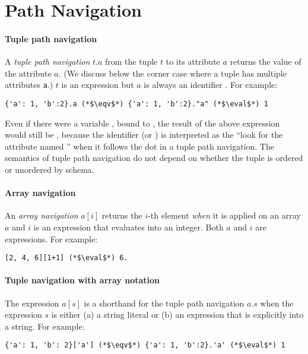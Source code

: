 \section{Path Navigation}
\label{section:paths}

\paragraph{Tuple path navigation} A \textit{tuple path navigation}
$t.a$ from the tuple $t$ to its attribute $a$  returns the
value of the attribute $a$. (We discuss below the corner case where a tuple has
multiple attributes \texttt{a}.)  $t$ is an expression but $a$ is always an
identifier . For example:

\begin{lstlisting}
{'a': 1, 'b':2}.a (*$\eqv$*) {'a': 1, 'b':2}."a" (*$\eval$*) 1    
\end{lstlisting}

\noindent Even if there were a variable , bound to , the result of
the above expression would still be , because the identifier  (or
) is interpreted as the ``look for the attribute named '' when it
follows the dot in a tuple path navigation.  The semantics of tuple path
navigation do not depend on whether the tuple is ordered or unordered by schema.

\paragraph{Array navigation} An \textit{array navigation} $a[i]$ returns
the $i$-th element \textit{when} it is applied on an array $a$  and $i$ is an expression that evaluates into an integer. Both $a$ and $i$
are expressions. For example:

\begin{lstlisting}
[2, 4, 6][1+1] (*$\eval$*) 6. 
\end{lstlisting}

\paragraph{Tuple navigation with array notation} The expression $a[s]$ is
a shorthand for the tuple path navigation $a.s$ when the expression $s$ is
either (a) a string literal or (b) an expression that is explicitly 
into a string. For example:

\begin{lstlisting}
{'a': 1, 'b': 2}['a'] (*$\eqv$*) {'a': 1, 'b':2}.'a' (*$\eval$*) 1
\end{lstlisting}

